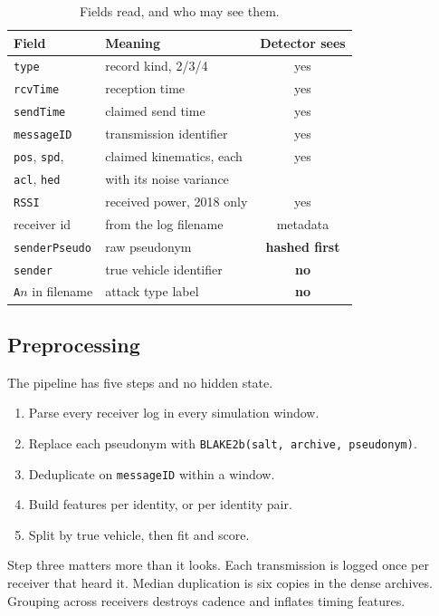 \documentclass[journal,twoside]{IEEEtran}
\begin{document}
\begin{table}[t]
\caption{Fields read, and who may see them.}
\label{tab:schema}
\centering
\footnotesize
\begin{tabular}{llc}
\toprule
Field & Meaning & Detector sees \\
\midrule
\texttt{type} & record kind, 2/3/4 & yes \\
\texttt{rcvTime} & reception time & yes \\
\texttt{sendTime} & claimed send time & yes \\
\texttt{messageID} & transmission identifier & yes \\
\texttt{pos}, \texttt{spd}, & claimed kinematics, each & yes \\
\texttt{acl}, \texttt{hed} & with its noise variance & \\
\texttt{RSSI} & received power, 2018 only & yes \\
receiver id & from the log filename & metadata \\
\midrule
\texttt{senderPseudo} & raw pseudonym & \textbf{hashed first} \\
\texttt{sender} & true vehicle identifier & \textbf{no} \\
\texttt{A}$n$ in filename & attack type label & \textbf{no} \\
\bottomrule
\end{tabular}
\end{table}

\subsection{Preprocessing}

The pipeline has five steps and no hidden state.

\begin{enumerate}
  \item Parse every receiver log in every simulation window.
  \item Replace each pseudonym with \texttt{BLAKE2b(salt, archive, pseudonym)}.
  \item Deduplicate on \texttt{messageID} within a window.
  \item Build features per identity, or per identity pair.
  \item Split by true vehicle, then fit and score.
\end{enumerate}

Step three matters more than it looks.
Each transmission is logged once per receiver that heard it.
Median duplication is six copies in the dense archives.
Grouping across receivers destroys cadence and inflates timing features.
\end{document}

